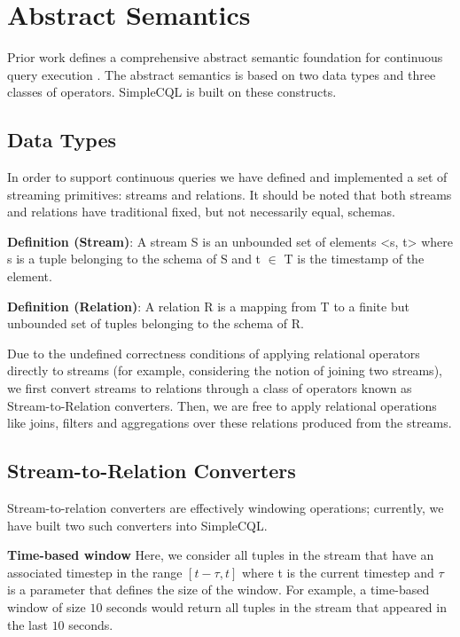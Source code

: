 \documentclass[a4paper, 10pt, conference]{IEEEconf}
\begin{document}
\section{Abstract Semantics}
Prior work defines a comprehensive abstract semantic foundation for continuous query execution \cite{cql}.  The abstract semantics is based on two data types and three classes of operators.  SimpleCQL is built on these constructs.

\subsection{Data Types}
In order to support continuous queries we have defined and implemented a set of streaming primitives: streams and relations. It should be noted that both streams and relations have traditional fixed, but not necessarily equal, schemas.

\textbf{Definition (Stream)}: A stream S is an unbounded set of elements <s, t> where s is a tuple belonging to the schema of S and t $\in$ T is the timestamp of the element.

\textbf{Definition (Relation)}:  A relation R is a mapping from T to a finite but unbounded set of tuples belonging to the schema of R.

Due to the undefined correctness conditions of applying relational operators directly to streams (for example, considering the notion of joining two streams), we first convert streams to relations through a class of operators known as Stream-to-Relation converters. Then, we are free to apply relational operations like joins, filters and aggregations over these relations produced from the streams. 

\subsection{Stream-to-Relation Converters}
Stream-to-relation converters are effectively windowing operations; currently, we have built two such converters into SimpleCQL.

\textbf{Time-based window} Here, we consider all tuples in the stream that have an associated timestep in the range $[t-\tau, t]$ where t is the current timestep and $\tau$ is a parameter that defines the size of the window. For example, a time-based window of size $10$ seconds would return all tuples in the stream that appeared in the last $10$ seconds.
\end{document}
